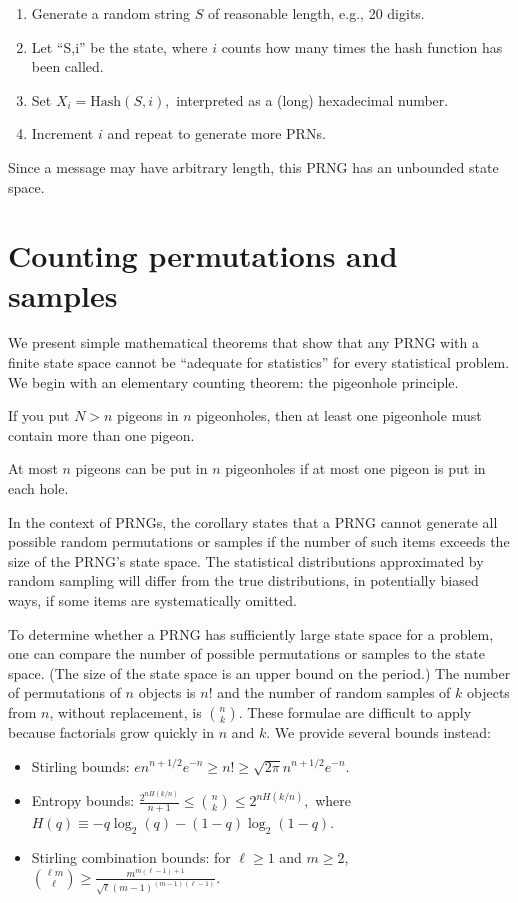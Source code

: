 \documentclass[graybox]{svmult}
\begin{document}
\begin{enumerate}
\item Generate a random string $S$ of reasonable length, e.g., 20 digits.
\item Let ``S,i'' be the state, where $i$ counts how many times the hash function has been called.
\item Set $X_i = {\mbox{Hash}}(S,i),$ interpreted as a (long) hexadecimal number.
\item Increment $i$ and repeat to generate more PRNs.
\end{enumerate}

Since a message may have arbitrary length, this PRNG has an unbounded state space.


\section{Counting permutations and samples}
\label{sec:count}

We present simple mathematical theorems that show that any PRNG with a finite state space
cannot be ``adequate for statistics'' for every statistical problem.
We begin with an elementary counting theorem: the pigeonhole principle.


\begin{theorem}
If you put $N>n$ pigeons in $n$ pigeonholes, then at least one
pigeonhole must contain more than one pigeon.
\end{theorem}
\begin{corollary}
At most $n$ pigeons can be put in $n$ pigeonholes if at most
one pigeon is put in each hole.
\end{corollary}

In the context of PRNGs, the corollary states that a PRNG cannot generate all possible random permutations or samples if
the number of such items exceeds the size of the PRNG's state space.
The statistical distributions approximated by random sampling will differ from the true distributions,
in potentially biased ways, if some items are systematically omitted.

To determine whether a PRNG has sufficiently large state space for a problem, one can compare the number of
possible permutations or samples to the state space.
(The size of the state space is an upper bound on the period.)
The number of permutations of $n$ objects is $n!$ and the number of random samples of $k$ objects from $n$,
 without replacement, is $n \choose k$.
These formulae are difficult to apply because factorials grow quickly in $n$ and $k$.
We provide several bounds instead:
\begin{itemize}
\item Stirling bounds: $ e n^{n+1/2} e^{-n} \ge n! \ge \sqrt{2 \pi} n^{n+1/2} e^{-n}.$
\item Entropy bounds:
$ \frac{2^{nH(k/n)}}{n+1} \le {n \choose k} \le 2^{nH(k/n)},$ where $H(q) \equiv -q \log_2(q) - (1-q) \log_2 (1-q)$.
\item Stirling combination bounds:
for $\ell \ge 1$ and $m \ge 2$, $ { {\ell m } \choose { \ell }} \ge \frac{m^{m(\ell-1)+1}}{\sqrt{\ell} (m-1)^{(m-1)(\ell-1)}}. $
\end{itemize}
\end{document}
